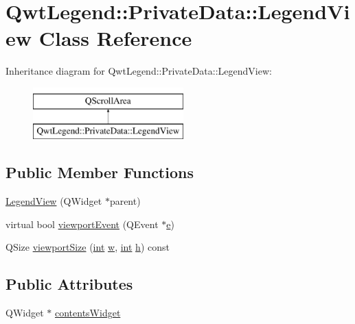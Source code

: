 \hypertarget{class_qwt_legend_1_1_private_data_1_1_legend_view}{\section{Qwt\-Legend\-:\-:Private\-Data\-:\-:Legend\-View Class Reference}
\label{class_qwt_legend_1_1_private_data_1_1_legend_view}
}
Inheritance diagram for Qwt\-Legend\-:\-:Private\-Data\-:\-:Legend\-View\-:\begin{figure}[H]
\begin{center}
\leavevmode
\includegraphics[height=2.000000cm]{class_qwt_legend_1_1_private_data_1_1_legend_view}
\end{center}
\end{figure}
\subsection*{Public Member Functions}
\begin{DoxyCompactItemize}
\item 
\hyperlink{class_qwt_legend_1_1_private_data_1_1_legend_view_a4b6311c2f3430bd163c10c60d6f19e05}{Legend\-View} (Q\-Widget $\ast$parent)
\item 
virtual bool \hyperlink{class_qwt_legend_1_1_private_data_1_1_legend_view_a8bf64ff0f5f4343f50cfd1e7e51f3c7c}{viewport\-Event} (Q\-Event $\ast$\hyperlink{_o_p_plots_8m_a9425be9aab51621e317ba7ade564b570}{e})
\item 
Q\-Size \hyperlink{class_qwt_legend_1_1_private_data_1_1_legend_view_afb8c5f527c430d080f382b14a62a2f2f}{viewport\-Size} (\hyperlink{ioapi_8h_a787fa3cf048117ba7123753c1e74fcd6}{int} \hyperlink{glext_8h_ac1795f3b2fee217274b85c2750e1a889}{w}, \hyperlink{ioapi_8h_a787fa3cf048117ba7123753c1e74fcd6}{int} \hyperlink{analyze_i_n_s_g_p_s_8m_afcefcf96b3c95673d4739bab1a16e58b}{h}) const 
\end{DoxyCompactItemize}
\subsection*{Public Attributes}
\begin{DoxyCompactItemize}
\item 
Q\-Widget $\ast$ \hyperlink{class_qwt_legend_1_1_private_data_1_1_legend_view_aaed6c3823d7a12468e7dc863919d74ef}{contents\-Widget}
\end{DoxyCompactItemize}


